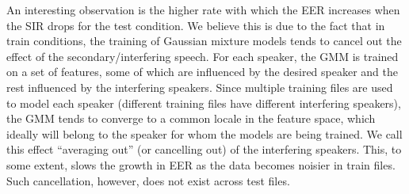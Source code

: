 An interesting observation is the higher rate with which the EER increases when the SIR drops for the test condition. 
We believe this is due to the fact that in train conditions, the training of Gaussian mixture models tends to cancel out the effect of the secondary/interfering speech. 
For each speaker, the GMM is trained on a set of features, some of which are influenced by the desired speaker and the rest influenced by the interfering speakers. 
Since multiple training files are used to model each speaker (different training files have different interfering speakers), the GMM tends to converge to a common locale in the feature space, which ideally will belong to the speaker for whom the models are being trained. 
We call this effect ``averaging out'' (or cancelling out) of the interfering speakers. 
This, to some extent, slows the growth in EER as the data becomes noisier in train files. 
Such cancellation, however, does not exist across test files.



